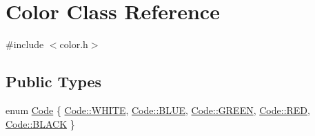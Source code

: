 \hypertarget{classColor}{}\section{Color Class Reference}
\label{classColor}


{\ttfamily \#include $<$color.\+h$>$}

\subsection*{Public Types}
\begin{DoxyCompactItemize}
\item 
enum \hyperlink{classColor_a20a7b04657c1d83fae5d54514d3f1622}{Code} \{ \newline
\hyperlink{classColor_a20a7b04657c1d83fae5d54514d3f1622ab5bf627e448384cf3a4c35121ca6008d}{Code\+::\+W\+H\+I\+TE}, 
\hyperlink{classColor_a20a7b04657c1d83fae5d54514d3f1622a1b3e1ee9bff86431dea6b181365ba65f}{Code\+::\+B\+L\+UE}, 
\hyperlink{classColor_a20a7b04657c1d83fae5d54514d3f1622a9de0e5dd94e861317e74964bed179fa0}{Code\+::\+G\+R\+E\+EN}, 
\hyperlink{classColor_a20a7b04657c1d83fae5d54514d3f1622aa2d9547b5d3dd9f05984475f7c926da0}{Code\+::\+R\+ED}, 
\newline
\hyperlink{classColor_a20a7b04657c1d83fae5d54514d3f1622a08d0012388564e95c3b4a7407cf04965}{Code\+::\+B\+L\+A\+CK}
 \}
\end{DoxyCompactItemize}
